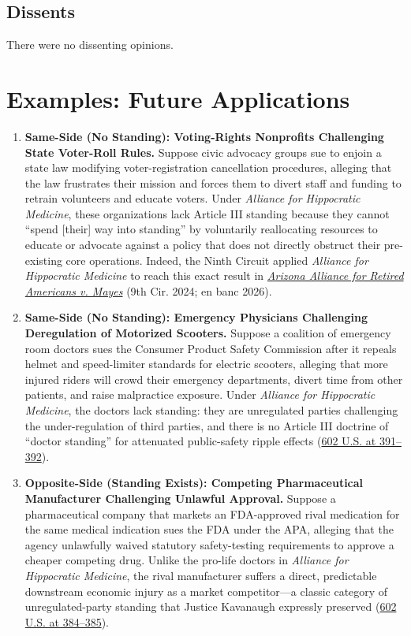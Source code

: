\documentclass[12pt]{article}
\begin{document}
\subsection{Dissents}

There were no dissenting opinions.

\section{Examples: Future Applications}

\begin{enumerate}
\item \textbf{Same-Side (No Standing): Voting-Rights Nonprofits Challenging State Voter-Roll Rules.} Suppose civic advocacy groups sue to enjoin a state law modifying voter-registration cancellation procedures, alleging that the law frustrates their mission and forces them to divert staff and funding to retrain volunteers and educate voters. Under \textit{Alliance for Hippocratic Medicine}, these organizations lack Article III standing because they cannot ``spend [their] way into standing'' by voluntarily reallocating resources to educate or advocate against a policy that does not directly obstruct their pre-existing core operations. Indeed, the Ninth Circuit applied \textit{Alliance for Hippocratic Medicine} to reach this exact result in \href{https://www.govinfo.gov/content/pkg/USCOURTS-ca9-22-16490/pdf/USCOURTS-ca9-22-16490-0.pdf}{\textit{Arizona Alliance for Retired Americans v. Mayes}} (9th Cir. 2024; en banc 2026).

\item \textbf{Same-Side (No Standing): Emergency Physicians Challenging Deregulation of Motorized Scooters.} Suppose a coalition of emergency room doctors sues the Consumer Product Safety Commission after it repeals helmet and speed-limiter standards for electric scooters, alleging that more injured riders will crowd their emergency departments, divert time from other patients, and raise malpractice exposure. Under \textit{Alliance for Hippocratic Medicine}, the doctors lack standing: they are unregulated parties challenging the under-regulation of third parties, and there is no Article III doctrine of ``doctor standing'' for attenuated public-safety ripple effects (\href{https://www.supremecourt.gov/opinions/23pdf/602us1r35_bqmd.pdf}{602 U.S. at 391--392}).

\item \textbf{Opposite-Side (Standing Exists): Competing Pharmaceutical Manufacturer Challenging Unlawful Approval.} Suppose a pharmaceutical company that markets an FDA-approved rival medication for the same medical indication sues the FDA under the APA, alleging that the agency unlawfully waived statutory safety-testing requirements to approve a cheaper competing drug. Unlike the pro-life doctors in \textit{Alliance for Hippocratic Medicine}, the rival manufacturer suffers a direct, predictable downstream economic injury as a market competitor---a classic category of unregulated-party standing that Justice Kavanaugh expressly preserved (\href{https://www.supremecourt.gov/opinions/23pdf/602us1r35_bqmd.pdf}{602 U.S. at 384--385}).


\end{enumerate}
\end{document}
